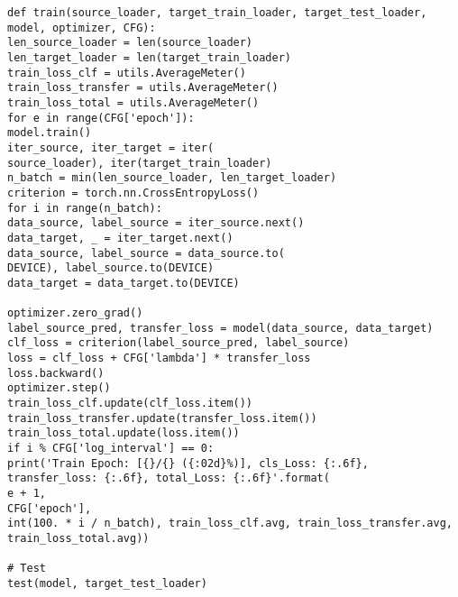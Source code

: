 \begin{lstlisting}[title=深度迁移网络代码实现, frame=shadowbox]
def train(source_loader, target_train_loader, target_test_loader, model, optimizer, CFG):
len_source_loader = len(source_loader)
len_target_loader = len(target_train_loader)
train_loss_clf = utils.AverageMeter()
train_loss_transfer = utils.AverageMeter()
train_loss_total = utils.AverageMeter()
for e in range(CFG['epoch']):
model.train()
iter_source, iter_target = iter(
source_loader), iter(target_train_loader)
n_batch = min(len_source_loader, len_target_loader)
criterion = torch.nn.CrossEntropyLoss()
for i in range(n_batch):
data_source, label_source = iter_source.next()
data_target, _ = iter_target.next()
data_source, label_source = data_source.to(
DEVICE), label_source.to(DEVICE)
data_target = data_target.to(DEVICE)

optimizer.zero_grad()
label_source_pred, transfer_loss = model(data_source, data_target)
clf_loss = criterion(label_source_pred, label_source)
loss = clf_loss + CFG['lambda'] * transfer_loss
loss.backward()
optimizer.step()
train_loss_clf.update(clf_loss.item())
train_loss_transfer.update(transfer_loss.item())
train_loss_total.update(loss.item())
if i % CFG['log_interval'] == 0:
print('Train Epoch: [{}/{} ({:02d}%)], cls_Loss: {:.6f}, transfer_loss: {:.6f}, total_Loss: {:.6f}'.format(
e + 1,
CFG['epoch'],
int(100. * i / n_batch), train_loss_clf.avg, train_loss_transfer.avg, train_loss_total.avg))

# Test
test(model, target_test_loader)
\end{lstlisting}

%
